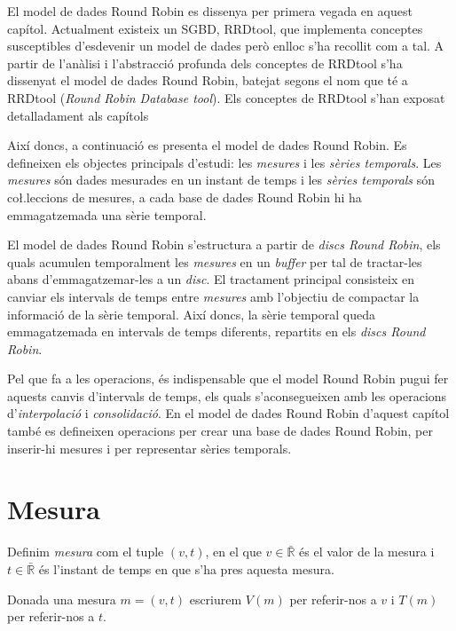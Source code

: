 El model de dades Round Robin es dissenya per primera vegada en aquest capítol. 
Actualment existeix un SGBD, RRDtool, que implementa conceptes susceptibles d'esdevenir un model de dades però enlloc s'ha recollit com a tal. A partir de l'anàlisi i l'abstracció profunda dels conceptes de RRDtool s'ha dissenyat el model de dades Round Robin, batejat segons el nom que té a RRDtool (\emph{Round Robin Database tool}). Els conceptes de RRDtool s'han exposat detalladament als capítols %


Així doncs, a continuació es presenta el model de dades Round Robin. 
Es defineixen els objectes principals d'estudi: les \emph{mesures} i les \emph{sèries temporals}. Les \emph{mesures} són dades mesurades en un instant de temps i les \emph{sèries temporals} són co\l.leccions de mesures, a cada base de dades Round Robin hi ha emmagatzemada una sèrie temporal. 

El model de dades Round Robin s'estructura a partir de \emph{discs Round Robin}, els quals  acumulen temporalment les \emph{mesures} en un \emph{buffer} per tal de tractar-les abans d'emmagatzemar-les  a un \emph{disc}. El tractament principal consisteix en canviar els intervals de temps entre \emph{mesures} amb l'objectiu de compactar la informació de la sèrie temporal.
Així doncs, la sèrie temporal queda emmagatzemada en intervals de temps diferents, repartits en els \emph{discs Round Robin}. 

Pel que fa a les operacions, és indispensable que el model Round Robin pugui fer aquests canvis d'intervals de temps, els quals s'aconsegueixen amb les operacions d'\emph{interpolació} i \emph{consolidació}. En el model de dades Round Robin d'aquest capítol també es defineixen operacions per crear una base de dades Round Robin, per inserir-hi mesures i per representar sèries temporals.


\section{Mesura}\label{sec:model:mesura} 

\begin{definition}[Mesura]
  \label{def:mesura}
  Definim \emph{mesura} com el tuple $(v,t)$, en el que
  $v\in\bar{\mathbb{R}}$ és el valor de la mesura i $t \in
  \bar{\mathbb{R}}$ és l'instant de temps en que s'ha pres aquesta
  mesura.
\end{definition}

Donada una mesura $m=(v,t)$ escriurem $V(m)$ per referir-nos a $v$ i
$T(m)$ per referir-nos a $t$.

